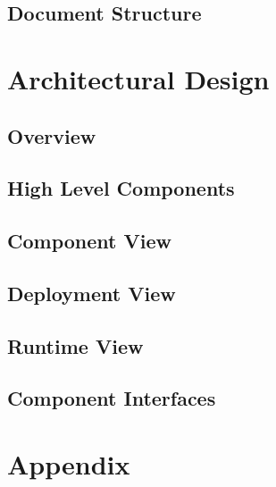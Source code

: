 \documentclass[a4paper,12pt]{report}
\begin{document}
\section{Document Structure}


\chapter{Architectural Design}
\label{ch:Arch_Design}

\section{Overview}


\newpage
\section{High Level Components}\label{high_level_comps}


\section{Component View}\label{component_view}


\section{Deployment View}\label{deployment_view}


\section{Runtime View}\label{runtime_view}


\section{Component Interfaces}\label{component_interface}


\appendix
\chapter{Appendix}



\end{document}
